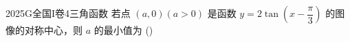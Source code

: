 
\begin{problem}{2025}{G}{全国I卷}{4}{三角函数}
若点 $(a,0)(a>0)$ 是函数 $y=2\tan\left(x-\dfrac{\pi}{3}\right)$ 的图像的对称中心，则 $a$ 的最小值为
(\hspace{1cm})
\begin{choices}
\end{choices}
\end{problem}